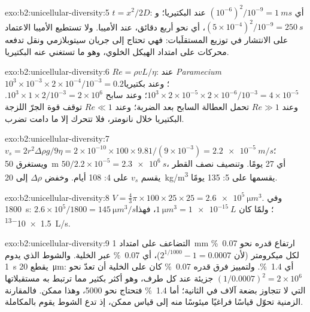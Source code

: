 \begin{solution}{exo:b2:unicellular-diversity:5}
$t = x^2/2D$: أي $(10^{-6})^2/10^{-9} = \qty{1}{ms}$ عند البكتيريا؛
و$(5\times 10^{-4})^2/10^{-9} = \qty{250}{s}$، أي نحو أربع دقائق،
عند الأميبا. ولا تستطيع الأميبا الاعتماد على الانتشار في توزيع
المستقلَبات: فهي تحتاج إلى جريان سيتوبلازمي ونقل تدفعه محركات على
امتداد الهيكل الخلوي، وهو ما تستغني عنه البكتيريا.
\end{solution}

\begin{solution}{exo:b2:unicellular-diversity:6}
$Re = \rho vL/\eta$: عند \emph{Paramecium} $10^3\times 10^{-3}\times
2\times 10^{-4}/10^{-3} = 0.2$؛ وعند بكتيريا $10^3\times 2\times
10^{-5}\times 2\times 10^{-6}/10^{-3} = 4\times 10^{-5}$؛ وعند سابح
$10^3\times 1\times 2/10^{-3} = 2\times 10^6$. وعند $Re \gg 1$ تحمل
العطالة السابح بعد الضربة؛ وعند $Re \ll 1$ توقف قوة الجرّ اللزجة
البكتيريا خلال نانومتر، فلا تتحرك إلا ما دامت تضرب.
\end{solution}

\begin{solution}{exo:b2:unicellular-diversity:7}
$v_s = 2r^2\Delta\rho g/9\eta = 2\times 10^{-10}\times 100\times
9.81/(9\times 10^{-3}) = \qty{2.2e-5}{m/s}$؛ ويستغرق \qty{50}{m}
$50/2.2\times 10^{-5} = \qty{2.3e6}{s}$، أي 27 يومًا. وتنصيف نصف
القطر يقسم $v_s$ على 4: 108 أيام. وخفض $\Delta\rho$ إلى
\qty{20}{kg/m^3} يقسمها على 5: 135 يومًا.
\end{solution}

\begin{solution}{exo:b2:unicellular-diversity:8}
$V = \tfrac{4}{3}\pi\times 100\times 25\times 25 =
\qty{2.6e5}{\micro m^3}$. وفي \qty{1800}{s}: $2.6\times 10^5/1800 =
\qty{145}{\micro m^3/s}$؛ ولمّا كان $\qty{1}{\micro m^3} =
\qty{1e-15}{L}$، فهذا \qty{1.5e-13}{L/s}.
\end{solution}

\begin{solution}{exo:b2:unicellular-diversity:9}
التضاعف على امتداد \qty{1}{mm} ارتفاع قدره نحو \qty{0.07}{\%} لكل
ميكرومتر (لأن $2^{1/1000} - 1 = 0.0007$)، أي \qty{0.07}{\%} عبر
الخلية. والشوط الذي يدوم \qty{1}{s} يقطع \qty{20}{\micro m}: أي
\qty{1.4}{\%}. ولتمييز فرق قدره \qty{0.07}{\%} كان على الخلية أن
تعدّ نحو $(1/0.0007)^2 = 2\times 10^6$ جزيئة عند كل طرف، وهو أكثر
بكثير مما ترتبط به مستقبلاتها التي لا تتجاوز بضعة آلاف في الثانية؛
أما \qty{1.4}{\%} فتحتاج نحو \num{5000}، وهذا ممكن. فالمقارنة
الزمنية تحوّل قياسًا فراغيًا ميئوسًا منه إلى قياس ممكن، إذ تدع
الشوط يقوم بالمكاملة.
\end{solution}

